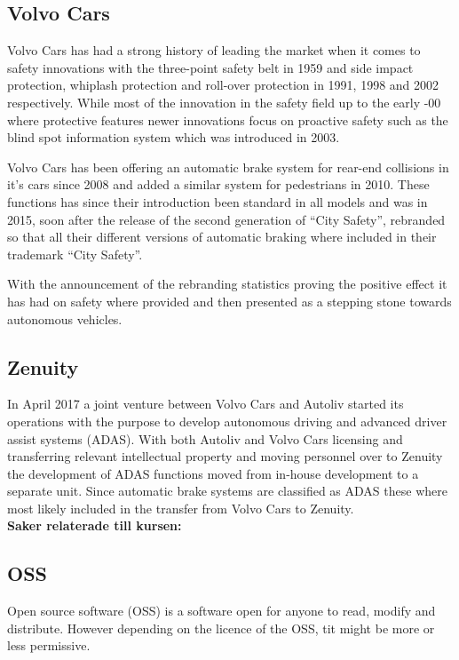 \documentclass[conference]{IEEEtran}
\begin{document}
\subsection{Volvo Cars}
Volvo Cars has had a strong history of leading the market when it comes to safety innovations with the three-point safety belt in 1959 and side impact protection, whiplash protection and roll-over protection in 1991, 1998 and 2002 respectively. 
While most of the innovation in the safety field up to the early -00 where protective features newer innovations focus on proactive safety such as the blind spot information system which was introduced in 2003.\cite{VolvoInnovation}

Volvo Cars has been offering an automatic brake system for rear-end collisions in it's cars since 2008 and added a similar system for pedestrians in 2010. \cite{VolvoInnovation}
These functions has since their introduction been standard in all models and was in 2015, soon after the release of the second generation of ``City Safety'', rebranded so that all their different versions of automatic braking where included in their trademark ``City Safety''.\cite{CitySafety}

With the announcement of the rebranding statistics proving the positive effect it has had on safety where provided and then presented as a stepping stone towards autonomous vehicles.\cite{CitySafety}
\subsection{Zenuity}
In April 2017 a joint venture between Volvo Cars and Autoliv started its operations with the purpose to develop autonomous driving and advanced driver assist systems (ADAS).\cite{ZenuityLaunch} With both Autoliv and Volvo Cars licensing and transferring relevant intellectual property and moving personnel over to Zenuity the development of ADAS functions moved from in-house development to a separate unit. Since automatic brake systems are classified as ADAS these where most likely included in the transfer from Volvo Cars to Zenuity. 
\\\textbf{Saker relaterade till kursen:}
\subsection{OSS}
Open source software (OSS) is a software open for anyone to read, modify and distribute. However depending on the licence of the OSS, tit might be more or less permissive. \cite{OSS}
\end{document}

